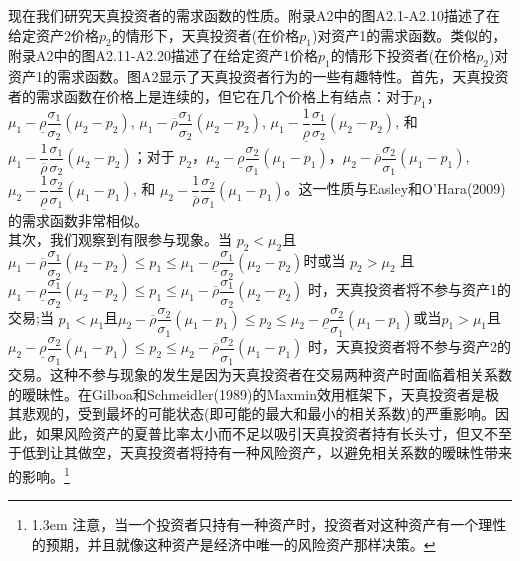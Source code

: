 \documentclass[10.0pt]{article}
\begin{document}
现在我们研究天真投资者的需求函数的性质。附录A2中的图A2.1-A2.10描述了在给定资产2价格$ p_2 $的情形下，天真投资者(在价格$ p_1 $)对资产1的需求函数。类似的，附录A2中的图A2.11-A2.20描述了在给定资产1价格$ p_1 $的情形下投资者(在价格$ p_2 $)对资产1的需求函数。图A2显示了天真投资者行为的一些有趣特性。首先，天真投资者的需求函数在价格上是连续的，但它在几个价格上有结点：对于$ p_1 $，$ \mu_1 - \underline{\rho} \dfrac{\sigma_1}{\sigma_2} (\mu_2 - p_2) $, $ \mu_1 - \overline{\rho} \dfrac{\sigma_1}{\sigma_2} (\mu_2 - p_2) $, $ \mu_1 - \dfrac1{\underline{\rho}} \dfrac{\sigma_1}{\sigma_2} (\mu_2 - p_2) $, 和 $ \mu_1 - \dfrac1{\overline{\rho}} \dfrac{\sigma_1}{\sigma_2} (\mu_2 - p_2) $；对于 $ p_2 $，$ \mu_2 - \underline{\rho} \dfrac{\sigma_2}{\sigma_1} (\mu_1 - p_1) $，$ \mu_2 - \overline{\rho} \dfrac{\sigma_2}{\sigma_1} (\mu_1 - p_1) $,$ \mu_2 - \dfrac1{\underline{\rho}} \dfrac{\sigma_2}{\sigma_1} (\mu_1 - p_1) $, 和 $ \mu_2 - \dfrac1{\overline{\rho}} \dfrac{\sigma_2}{\sigma_1} (\mu_1 - p_1) $。这一性质与Easley和O'Hara(2009)的需求函数非常相似。\\






其次，我们观察到有限参与现象。当 $ p_2 < \mu_2 $且$ \mu_1 - \overline{\rho} \dfrac{\sigma_1}{\sigma_2} (\mu_2 - p_2) \leqslant p_1 \leqslant \mu_1 - \underline{\rho} \dfrac{\sigma_1}{\sigma_2} (\mu_2 - p_2) $时或当  $ p_2 > \mu_2 $ 且$ \mu_1 - \underline{\rho} \dfrac{\sigma_1}{\sigma_2} (\mu_2 - p_2) \leqslant p_1 \leqslant \mu_1 - \overline{\rho} \dfrac{\sigma_1}{\sigma_2} (\mu_2 - p_2)$ 时，天真投资者将不参与资产1的交易;当 $ p_1 < \mu_1 $且$ \mu_2 - \overline{\rho} \dfrac{\sigma_2}{\sigma_1} (\mu_1 - p_1) \leqslant p_2 \leqslant \mu_2 - \underline{\rho} \dfrac{\sigma_2}{\sigma_1} (\mu_1 - p_1) $或当$ p_1 > \mu_1 $且 $ \mu_2 - \underline{\rho} \dfrac{\sigma_2}{\sigma_1} (\mu_1 - p_1) \leqslant p_2 \leqslant \mu_2 - \overline{\rho} \dfrac{\sigma_2}{\sigma_1} (\mu_1 - p_1) $ 时，天真投资者将不参与资产2的交易。这种不参与现象的发生是因为天真投资者在交易两种资产时面临着相关系数的暧昧性。在Gilboa和Schmeidler(1989)的Maxmin效用框架下，天真投资者是极其悲观的，受到最坏的可能状态(即可能的最大和最小的相关系数)的严重影响。因此，如果风险资产的夏普比率太小而不足以吸引天真投资者持有长头寸，但又不至于低到让其做空，天真投资者将持有一种风险资产，以避免相关系数的暧昧性带来的影响。\footnote{\baselineskip1.3em 注意，当一个投资者只持有一种资产时，投资者对这种资产有一个理性的预期，并且就像这种资产是经济中唯一的风险资产那样决策。}
\end{document}
